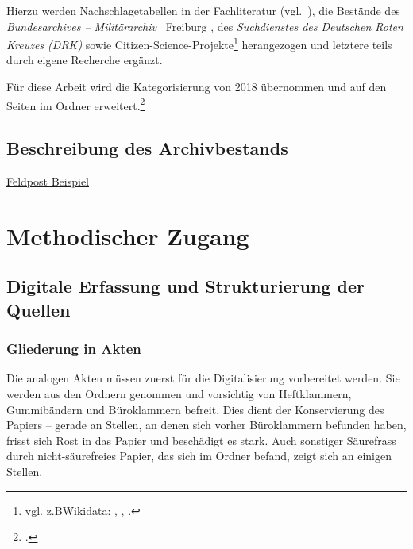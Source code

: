 \documentclass[12pt, a4paper, ngerman, bidi=default]{article}
\let\cite\footcite
\begin{document}
Hierzu werden Nachschlagetabellen in der Fachliteratur (vgl.~\autocites{tessin_verbande_1977}{hartmann_wehrmacht_2010}{rass_deutsche_2009}), die Bestände des \textit{Bundesarchives – Militärarchiv\ } Freiburg \autocite{hollmann_freiburg_2025}, des \textit{Suchdienstes des Deutschen Roten Kreuzes (DRK)} \autocite{reuter_drk_2025} sowie Citizen-Science-Projekte\footnote{ vgl. z.B\. Wikidata: \autocite{burkhardt_78th_2024}, \autocite{altenburger_lexikon_nodate-1}, \autocite{hermans_forum_nodate}.} herangezogen und letztere teils durch eigene Recherche ergänzt.


Für diese Arbeit wird die Kategorisierung von 2018 übernommen und auf den Seiten im Ordner erweitert.\cite[vgl.][]{burkhardt_githubakten_gesamtubersichtcsv_2025} 

\subsection{Beschreibung des Archivbestands}
\newpage

\href{https://free.iiifhosting.com/iiif/959173f8d808ab12ad7847917f79e0e4bc974ebce0040a07afd4b8be3f10c234/}{Feldpost Beispiel}

    
\section{Methodischer Zugang}
    
    \subsection{Digitale Erfassung und Strukturierung der Quellen}
    \subsubsection{Gliederung in Akten}

    Die analogen Akten müssen zuerst für die Digitalisierung vorbereitet werden. Sie werden aus den Ordnern genommen und vorsichtig von Heftklammern, 
    Gummibändern und Büroklammern befreit. Dies dient der Konservierung des Papiers – gerade an Stellen, an denen sich vorher Büroklammern befunden haben, 
    frisst sich Rost in das Papier und beschädigt es stark. Auch sonstiger Säurefrass durch nicht-säurefreies Papier, das sich im Ordner befand, zeigt sich an einigen Stellen.\\
\end{document}
